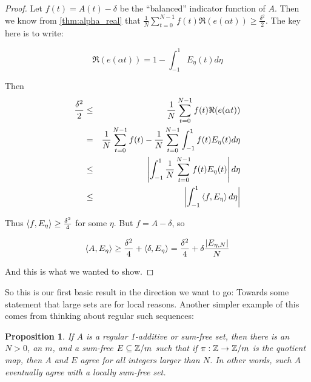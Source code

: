 \documentclass{article}
\newtheorem{proposition}[theorem]{Proposition}
\theoremstyle{definition}
\theoremstyle{remark}
\numberwithin{equation}{section}
\begin{document}
\begin{proof}
  Let $f(t) = A(t) - \delta$ be the ``balanced'' indicator function of
  $A$.  Then we know from \ref{thm:alpha_real} that $\frac{1}{N}\sum_{t=0}^{N-1}
  f(t)\Re(e(\alpha t)) \geq \frac{\delta^2}{2}$.  The key here is to
  write: 

  \[\Re(e(\alpha t)) = 1-\int_{-1}^1 E_\eta(t)d\eta\]

  Then 
  \begin{eqnarray*}
    \frac{\delta^2}{2} &\leq& \frac{1}{N}\sum_{t=0}^{N-1}
                              f(t)\Re(e(\alpha t)) \\
                       &=& \frac{1}{N}\sum_{t=0}^{N-1}
                           f(t) -  \frac{1}{N}\sum_{t=0}^{N-1}
                           \int_{-1}^1 f(t) E_\eta(t)d\eta\\
                       &\leq& \left|\int_{-1}^1 \frac{1}{N}\sum_{t=0}^{N-1} f(t) E_\eta(t)\right|d\eta\\
                       &\leq& \left|\int_{-1}^1 \left<f, E_\eta\right> d\eta\right|
\end{eqnarray*}

Thus $\left<f, E_\eta\right> \geq \frac{\delta^2}{4}$ for some $\eta$.  But
$f = A - \delta$, so 

\[\left<A, E_\eta\right> \geq \frac{\delta^2}{4} + \left<\delta, E_\eta\right> =
  \frac{\delta^2}{4} + \delta \frac{|E_{\eta,N}|}{N}\]

And this is what we wanted to show.
\end{proof}

So this is our first basic result in the direction we want to go:
Towards some statement that large \relevant sets are \relevant for
local reasons.  Another simpler example of this comes from thinking
about regular such sequences: 

\begin{proposition}\label{prop:regular_sumfree}
  If $A$ is a regular 1-additive or sum-free set, then there is an
  $N > 0$, an $m$, and a sum-free $E \subseteq \mathbb{Z}/m$ such that if
  $\pi : \mathbb{Z} \to \mathbb{Z}/m$ is the quotient map, then $A$ and $E$ agree for
  all integers larger than $N$.  In other words, such $A$ eventually
  agree with a locally sum-free set. 
\end{proposition}
\end{document}
